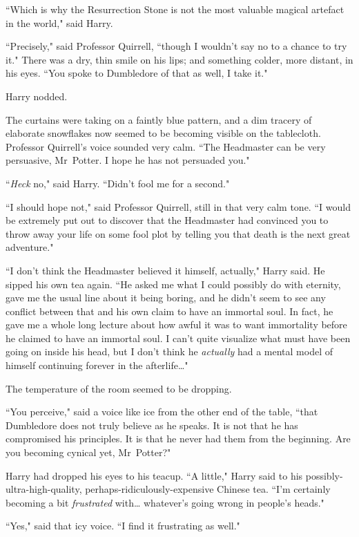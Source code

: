 ``Which is why the Resurrection Stone is not the most valuable magical artefact in the world," said Harry.

``Precisely," said Professor Quirrell, ``though I wouldn't say no to a chance to try it." There was a dry, thin smile on his lips; and something colder, more distant, in his eyes. ``You spoke to Dumbledore of that as well, I take it."

Harry nodded.

The curtains were taking on a faintly blue pattern, and a dim tracery of elaborate snowflakes now seemed to be becoming visible on the tablecloth. Professor Quirrell's voice sounded very calm. ``The Headmaster can be very persuasive, Mr~Potter. I hope he has not persuaded you."

``\emph{Heck} no," said Harry. ``Didn't fool me for a second."

``I should hope not," said Professor Quirrell, still in that very calm tone. ``I would be extremely put out to discover that the Headmaster had convinced you to throw away your life on some fool plot by telling you that death is the next great adventure."

``I don't think the Headmaster believed it himself, actually," Harry said. He sipped his own tea again. ``He asked me what I could possibly do with eternity, gave me the usual line about it being boring, and he didn't seem to see any conflict between that and his own claim to have an immortal soul. In fact, he gave me a whole long lecture about how awful it was to want immortality before he claimed to have an immortal soul. I can't quite visualize what must have been going on inside his head, but I don't think he \emph{actually} had a mental model of himself continuing forever in the afterlife{\ldots}"

The temperature of the room seemed to be dropping.

``You perceive," said a voice like ice from the other end of the table, ``that Dumbledore does not truly believe as he speaks. It is not that he has compromised his principles. It is that he never had them from the beginning. Are you becoming cynical yet, Mr~Potter?"

Harry had dropped his eyes to his teacup. ``A little," Harry said to his possibly-ultra-high-quality, perhaps-ridiculously-expensive Chinese tea. ``I'm certainly becoming a bit \emph{frustrated} with{\ldots} whatever's going wrong in people's heads."

``Yes," said that icy voice. ``I find it frustrating as well."

